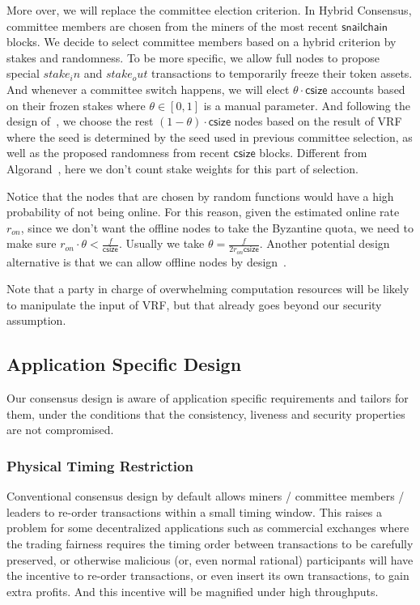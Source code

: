 \documentclass[9pt,oneside]{amsart}
\begin{document}
\begin{multicols}{2}
More over, we will replace the committee election criterion. In Hybrid Consensus, committee members are chosen from the miners of the most recent
$\mathsf{snailchain}$ blocks. We decide to select committee members based on a hybrid criterion by stakes and randomness. To be more specific, we allow
full nodes to propose special $stake_in$ and $stake_out$ transactions to temporarily freeze their token assets. And whenever a committee
switch happens, we will elect $\theta \cdot \mathsf{csize}$ accounts based on their frozen stakes where $\theta \in [0,1]$ is a manual parameter.
And following the design of~\cite{gilad2017algorand}, we choose the rest $(1-\theta)\cdot \mathsf{csize}$ nodes based on the result of
VRF~\cite{micali1999verifiable} where the seed is determined by the seed used in previous committee selection, as well as the proposed randomness
from recent $\mathsf{csize}$ blocks. Different from Algorand~\cite{gilad2017algorand}, here we don't count stake weights for this part of selection.

Notice that the nodes that are chosen by random functions would have a high probability of not being online. For this reason, given the estimated online
rate $r_{on}$, since we don't want the offline nodes to take the Byzantine quota, we need to make sure $r_{on}\cdot \theta < \frac{f}{\mathsf{csize}}$.
Usually we take $\theta = \frac{f}{2 r_{on} \mathsf{csize}}$. Another potential design alternative is that we can allow offline nodes by design~\cite{pass2017sleepy}.

Note that a party in charge of overwhelming computation resources will be likely to manipulate the input of VRF, but that already goes beyond our security assumption.

\subsection{Application Specific Design}

Our consensus design is aware of application specific requirements and tailors for them, under the conditions that the consistency, liveness
and security properties are not compromised.

\subsubsection{Physical Timing Restriction}

Conventional consensus design by default allows miners / committee members / leaders to re-order transactions within a small timing window.
This raises a problem for some decentralized applications such as commercial exchanges where the trading fairness requires the timing order between
transactions to be carefully preserved, or otherwise malicious (or, even normal rational) participants will have the incentive to re-order transactions,
or even insert its own transactions, to gain extra profits. And this incentive will be magnified under high throughputs.


\end{multicols}
\end{document}
